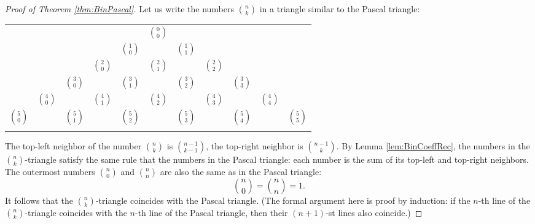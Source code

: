 \begin{proof}[Proof of Theorem \ref{thm:BinPascal}]
Let us write the numbers $\binom{n}{k}$ in a triangle similar to the Pascal triangle:
\begin{center}
\begin{tabular}{ccccccccccc}
&    &    &    &    &  $\binom{0}{0}$\\\noalign{\smallskip\smallskip}
&    &    &    &  $\binom{1}{0}$ &    &  $\binom{1}{1}$\\\noalign{\smallskip\smallskip}
&    &    &  $\binom{2}{0}$ &    &  $\binom{2}{1}$ &    &  $\binom{2}{2}$\\\noalign{\smallskip\smallskip}
&    &  $\binom{3}{0}$ &    &  $\binom{3}{1}$ &    &  $\binom{3}{2}$ &    &  $\binom{3}{3}$\\\noalign{\smallskip\smallskip}
&  $\binom{4}{0}$ &    &  $\binom{4}{1}$ &    &  $\binom{4}{2}$ &    &  $\binom{4}{3}$ &    & $\binom{4}{4}$\\\noalign{\smallskip\smallskip}
$\binom{5}{0}$ &   &  $\binom{5}{1}$ &    & $\binom{5}{2}$ &    & $\binom{5}{3}$ &    &  $\binom{5}{4}$ &   & $\binom{5}{5}$\\\noalign{\smallskip\smallskip}
\end{tabular}
\end{center}
The top-left neighbor of the number $\binom{n}{k}$ is $\binom{n-1}{k-1}$, the top-right neighbor is $\binom{n-1}{k}$.
By Lemma \ref{lem:BinCoeffRec}, the numbers in the $\binom{n}{k}$-triangle satisfy the same rule that the numbers in the Pascal triangle:
each number is the sum of its top-left and top-right neighbors.
The outermost numbers $\binom{n}{0}$ and $\binom{n}{n}$ are also the same as in the Pascal triangle:
\[
\binom{n}{0} = \binom{n}{n} = 1.
\]
It follows that the $\binom{n}{k}$-triangle coincides with the Pascal triangle.
(The formal argument here is proof by induction:
if the $n$-th line of the $\binom{n}{k}$-triangle coincides with the $n$-th line of the Pascal triangle,
then their $(n+1)$-st lines also coincide.)
\end{proof}






